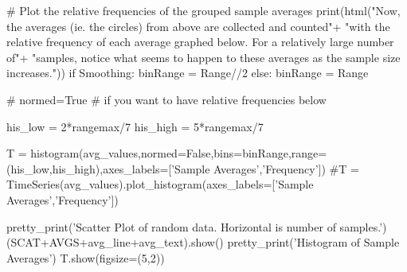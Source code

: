 \documentclass[10pt,]{book}
\numberwithin{equation}{section}
\begin{document}
\begin{sageinput}
    
#  Plot the relative frequencies of the grouped sample averages
    print(html("Now, the averages (ie. the circles) from above are collected and counted\n"+
         "with the relative frequency of each average graphed below.  For a relatively large number of\n"+
         "samples, notice what seems to happen to these averages as the sample size increases."))
    if Smoothing:
        binRange = Range//2
    else:
        binRange = Range
    
    # normed=True  # if you want to have relative frequencies below
    
    his_low = 2*rangemax/7
    his_high = 5*rangemax/7
    
    T = histogram(avg_values,normed=False,bins=binRange,range=(his_low,his_high),axes_labels=['Sample Averages','Frequency']) 
    #T = TimeSeries(avg_values).plot_histogram(axes_labels=['Sample Averages','Frequency'])   
    
    pretty_print('Scatter Plot of random data.  Horizontal is number of samples.')
    (SCAT+AVGS+avg_line+avg_text).show()
    pretty_print('Histogram of Sample Averages')
    T.show(figsize=(5,2))
\end{sageinput}
%
\par
\hypertarget{p-1270}{}%
\leavevmode%
\end{document}
